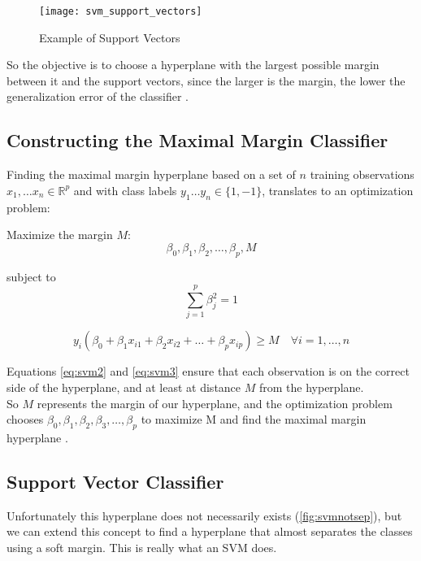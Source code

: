 \begin{figure}[H]
	\centering
	\texttt{[image: svm\_support\_vectors]}
	\caption{Example of Support Vectors}
	\label{fig:suppvec}
\end{figure}

So the objective is to choose a hyperplane with the largest possible margin between it and the support vectors, since the larger is the margin, the lower the generalization error of the classifier \cite{ISLR}.

\subsection{Constructing the Maximal Margin Classifier}
Finding the maximal margin hyperplane based on a set of $n$ training observations $x_1, \dots x_n \in \mathbb{R}^p$ and with class labels $y_1 \dots y_n \in \{1, -1\}$, translates to an optimization problem:

Maximize the margin $M$:
\begin{equation} \label{eq:svm1}
\beta_0, \beta_1, \beta_2, \dots, \beta_p, M
\end{equation}

subject to
\begin{equation} \label{eq:svm2}
\sum_{j=1}^{p}\beta^2_j = 1
\end{equation}

\begin{equation} \label{eq:svm3}
y_i(\beta_0 + \beta_1 x_{i1} + \beta_2 x_{i2} + \dots + \beta_p x_{ip}) \ge M \quad \forall i = 1, \dots, n
\end{equation}

Equations \ref{eq:svm2} and \ref{eq:svm3} ensure that each observation is on the correct side of the hyperplane, and at least at distance $M$ from the hyperplane. \\
So $M$ represents the margin of our hyperplane, and the optimization problem chooses $\beta_0, \beta_1, \beta_2, \beta_3, \dots, \beta_p$ to maximize M and find the maximal margin hyperplane \cite{ISLR}.

\subsection{Support Vector Classifier}
Unfortunately this hyperplane does not necessarily exists (\ref{fig:svmnotsep}), but we can extend this concept to find a hyperplane that almost separates the classes using a soft margin. This is really what an SVM does.

